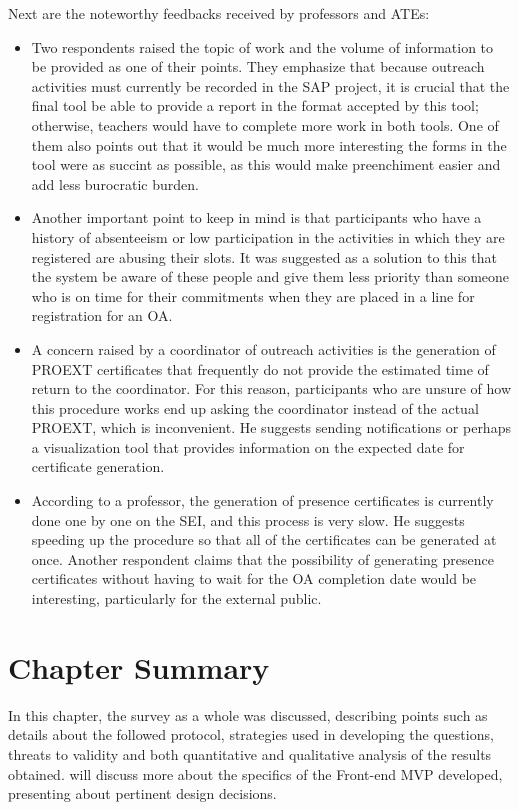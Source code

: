 Next are the noteworthy feedbacks received by professors and \acp{ATE}:
\begin{itemize}
  \item Two respondents raised the topic of work and the volume of information to be provided as one of their points. They emphasize that because outreach activities must currently be recorded in the \ac{SAP} project, it is crucial that the final tool be able to provide a report in the format accepted by this tool; otherwise, teachers would have to complete more work in both tools. One of them also points out that it would be much more interesting the forms in the tool were as succint as possible, as this would make preenchiment easier and add less burocratic burden.
  \item Another important point to keep in mind is that participants who have a history of absenteeism or low participation in the activities in which they are registered are abusing their slots. It was suggested as a solution to this that the system be aware of these people and give them less priority than someone who is on time for their commitments when they are placed in a line for registration for an \ac{OA}.
  \item A concern raised by a coordinator of outreach activities is the generation of \ac{PROEXT} certificates that frequently do not provide the estimated time of return to the coordinator. For this reason, participants who are unsure of how this procedure works end up asking the coordinator instead of the actual \ac{PROEXT}, which is inconvenient. He suggests sending notifications or perhaps a visualization tool that provides information on the expected date for certificate generation.
  \item According to a professor, the generation of presence certificates is currently done one by one on the \ac{SEI}, and this process is very slow. He suggests speeding up the procedure so that all of the certificates can be generated at once. Another respondent claims that the possibility of generating presence certificates without having to wait for the \ac{OA} completion date would be interesting, particularly for the external public.
\end{itemize}

\section{Chapter Summary}\label{survey:chapter-summary}

In this chapter, the survey as a whole was discussed, describing points such as details about the followed protocol, strategies used in developing the questions, threats to validity and both quantitative and qualitative analysis of the results obtained.  will discuss more about the specifics of the Front-end \ac{MVP} developed, presenting about pertinent design decisions.